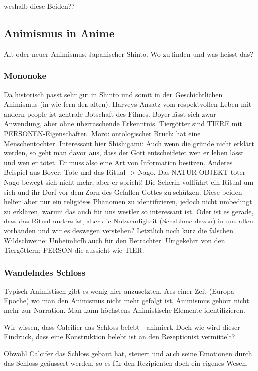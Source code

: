 weshalb diese Beiden??

\subsection{Animismus in Anime}
Alt oder neuer Animismus. Japanischer Shinto. Wo zu finden und was heisst das?

\subsubsection*{Mononoke}
Da historisch passt sehr gut in Shinto und somit in den Geschichtlichen Animismus (in wie fern den alten). Harveys Ansatz vom respektvollen Leben mit andern people ist zentrale Botschaft des Filmes. Boyer lässt sich zwar Anwendung, aber ohne überraschende Erkenntnis. Tiergötter sind TIERE mit PERSONEN-Eigenschaften. Moro: ontologischer Bruch: hat eine Menschentochter. Interessant hier Shishigami: Auch wenn die gründe nicht erklärt werden, so geht man davon aus, dass der Gott entscheidetet wen er leben lässt und wen er tötet. Er muss also eine Art von Information besitzen. Anderes Beispiel aus Boyer: Tote und das Ritual -> Nago. Das NATUR OBJEKT toter Nago bewegt sich nicht mehr, aber er spricht! Die Seherin vollführt ein Ritual um sich und ihr Dorf vor dem Zorn des Gefallen Gottes zu schützen. Diese beiden helfen aber nur ein religiöses Phänomen zu identifizieren, jedoch nicht umbedingt zu erklären, warum das auch für uns westler so interessant ist. Oder ist es gerade, dass das Ritual anders ist, aber die Notwendigkeit (Schablone davon) in uns allen vorhanden und wir es deswegen verstehen? Letztlich noch kurz die falschen Wildschweine: Unheimlicfh auch für den Betrachter. Umgekehrt von den Tiergöttern: PERSON die aussieht wie TIER.

\subsubsection*{Wandelndes Schloss}
Typisch Animistisch gibt es wenig hier anzusetzten. Aus einer Zeit (Europa Epoche) wo man den Animismus nicht mehr gefolgt ist. Animismus gehört nicht mehr zur Narration. Man kann höchstens Animistische Elemente identifizieren. 

Wir wissen, dass Calcifier das Schloss belebt - animiert. Doch wie wird dieser Eindruck, dass eine Konstruktion belebt ist an den Rezeptionist vermittelt?

Obwohl Calcifer das Schloss gebaut hat, steuert und auch seine Emotionen durch das Schloss geäussert werden, so es für den Rezipienten doch ein eigenes Wesen.


